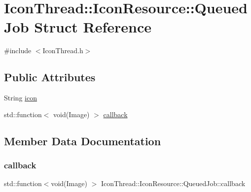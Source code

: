 \hypertarget{structIconThread_1_1IconResource_1_1QueuedJob}{}\section{Icon\+Thread\+:\+:Icon\+Resource\+:\+:Queued\+Job Struct Reference}
\label{structIconThread_1_1IconResource_1_1QueuedJob}


{\ttfamily \#include $<$Icon\+Thread.\+h$>$}

\subsection*{Public Attributes}
\begin{DoxyCompactItemize}
\item 
String \mbox{\hyperlink{structIconThread_1_1IconResource_1_1QueuedJob_aa56436c86eb06743752cc76e5cdf89db}{icon}}
\item 
std\+::function$<$ void(Image) $>$ \mbox{\hyperlink{structIconThread_1_1IconResource_1_1QueuedJob_acd3708150b06e8b52bd0148fdc8cc2b0}{callback}}
\end{DoxyCompactItemize}


\subsection{Member Data Documentation}
\mbox{\label{structIconThread_1_1IconResource_1_1QueuedJob_acd3708150b06e8b52bd0148fdc8cc2b0}} 
\subsubsection{\texorpdfstring{callback}{callback}}
{\footnotesize\ttfamily std\+::function$<$void(Image) $>$ Icon\+Thread\+::\+Icon\+Resource\+::\+Queued\+Job\+::callback}

\mbox{\label{structIconThread_1_1IconResource_1_1QueuedJob_aa56436c86eb06743752cc76e5cdf89db}} 
